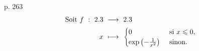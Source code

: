 \cite{contre-exemples} p. 263
\begin{alignat*}{2}
    \text{Soit } f\ :\ \R\ &\longrightarrow\ \R\\
    x\ &\longmapsto\ 
    \begin{cases}
        0 &\text{ si } x \leqslant 0,\\
        \exp \left(-\frac{1}{x^2}\right) &\text{ sinon}.
    \end{cases}
\end{alignat*}
        